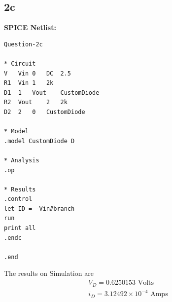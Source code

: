 \documentclass{article}
\begin{document}
\subsection{2c}
\textbf{SPICE Netlist:}
\begin{lstlisting}
Question-2c

* Circuit
V	Vin	0	DC	2.5
R1	Vin	1	2k
D1	1	Vout	CustomDiode
R2	Vout	2	2k
D2	2	0	CustomDiode

* Model
.model CustomDiode D

* Analysis
.op

* Results
.control
let ID = -Vin#branch
run
print all
.endc

.end
\end{lstlisting}
The results on Simulation are\\
\begin{align}
    V_D = 0.6250153 \text{ Volts}\\
    i_D = 3.12492 \times 10^{-4} \text{ Amps}    
\end{align}

\end{document}
